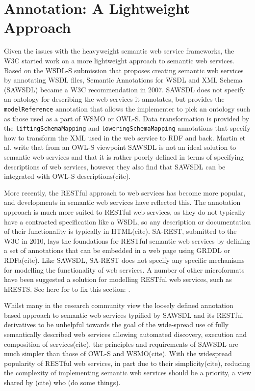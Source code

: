 \section{Annotation: A Lightweight Approach}

Given the issues with the heavyweight semantic web service frameworks, the W3C
started work on a more lightweight approach to semantic web services. Based on
the WSDL-S submission that proposes creating semantic web services by annotating
WSDL files, Semantic Annotations for WSDL and XML Schema (SAWSDL) became a W3C
recommendation in 2007. SAWSDL does not specify an ontology for describing the
web services it annotates, but provides the \verb=modelReference= annotation that allows the
implementer to pick an ontology such as those used as a part of  WSMO or OWL-S.
Data transformation is
provided by the \verb=liftingSchemaMapping= and \verb=loweringSchemaMapping=
annotations that specify how to transform the XML used in the web service to
RDF and back. Martin et al. write that from an OWL-S viewpoint SAWSDL is not an
ideal solution to semantic web services and that it is rather poorly defined
in terms of specifying descriptions of web services, however they also find that
SAWSDL can be integrated with OWL-S descriptions(cite).

More recently, the RESTful approach to web services has become more popular, and
developments in semantic web services have reflected this. The annotation
approach is much more suited to RESTful web services, as they do not typically
have a contracted specification like a WSDL, so any description or documentation
of their functionality is typically in HTML(cite). SA-REST, submitted to the W3C
in 2010, lays the foundations for RESTful semantic web services by defining a
set of annotations that can be embedded in a web page using GRDDL or RDFa(cite).
Like SAWSDL, SA-REST does not specify any specific mechanisms for modelling the
functionality of web services. A number of other microformats have been
suggested a solution for modelling RESTful web services, such as
hRESTS. See here for to fix this section: \cite{maleshkova_adapting_2009}.

Whilst many in the research community view the loosely defined annotation based approach
to semantic web services typified by SAWSDL and its RESTful derivatives to be
unhelpful towards the goal of the wide-spread use of fully semantically
described web services allowing automated discovery, execution and composition
of services(cite), the principles and requirements of SAWSDL are much simpler
than those of OWL-S and WSMO(cite). With the widespread popularity of RESTful
web services, in part due to their simplicity(cite), reducing the complexity of
implementing semantic web services should be a priority, a view shared by
(cite) who (do some things). 

